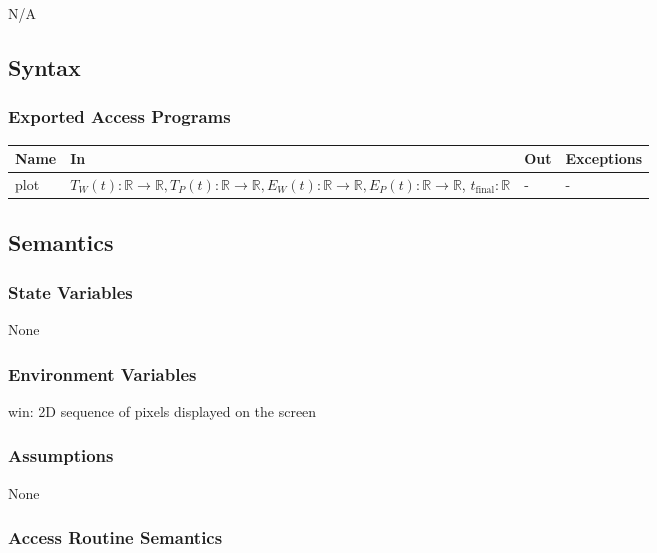 \documentclass[12pt, titlepage]{article}
\begin{document}
N/A

\subsection{Syntax}

\subsubsection{Exported Access Programs}

\begin{center}
\begin{tabular}{p{2cm} p{8cm} p{2cm} p{2cm}}
\hline
\textbf{Name} & \textbf{In} & \textbf{Out} & \textbf{Exceptions} \\
\hline
plot & $T_W(t):\mathbb{R} \rightarrow \mathbb{R},
                 T_P(t):\mathbb{R} \rightarrow \mathbb{R},
                 E_W(t):\mathbb{R} \rightarrow \mathbb{R},
       E_P(t):\mathbb{R} \rightarrow \mathbb{R}$, $t_\text{final}: \mathbb{R}$ & - & - \\
\hline
\end{tabular}
\end{center}

\subsection{Semantics}

\subsubsection{State Variables}

None

\subsubsection{Environment Variables}

win: 2D sequence of pixels displayed on the screen\\

\subsubsection{Assumptions}

None

\subsubsection{Access Routine Semantics}
\end{document}
